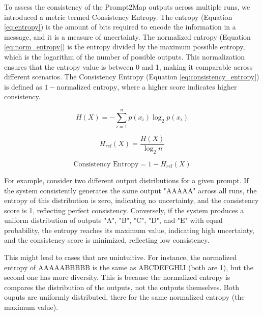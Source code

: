 To assess the consistency of the Prompt2Map outputs across multiple runs, we introduced a metric termed Consistency Entropy. The entropy (Equation \ref{eq:entropy}) is the amount of bits required to encode the information in a message, and it is a measure of uncertainty. The normalized entropy (Equation \ref{eq:norm_entropy}) is the entropy divided by the maximum possible entropy, which is the logarithm of the number of possible outputs. This normalization ensures that the entropy value is between 0 and 1, making it comparable across different scenarios. The Consistency Entropy (Equation \ref{eq:consistency_entropy}) is defined as \(1 - \text{normalized entropy}\), where a higher score indicates higher consistency.

\begin{equation}
    H(X) = - \sum_{i=1}^{n} p(x_i) \log_2 p(x_i)
    \label{eq:entropy}
\end{equation}

\begin{equation}
    H_{rel}(X) = \frac{H(X)}{\log_2 n} 
    \label{eq:norm_entropy}
\end{equation}

\begin{equation}
    \text{Consistency Entropy} = 1 - H_{rel}(X)
    \label{eq:consistency_entropy}
\end{equation}



For example, consider two different output distributions for a given prompt. If the system consistently generates the same output "AAAAA" across all runs, the entropy of this distribution is zero, indicating no uncertainty, and the consistency score is 1, reflecting perfect consistency. Conversely, if the system produces a uniform distribution of outputs "A", "B", "C", "D", and "E" with equal probability, the entropy reaches its maximum value, indicating high uncertainty, and the consistency score is minimized, reflecting low consistency.

This might lead to cases that are unintuitive. For instance, the normalized entropy of AAAAABBBBB is the same as ABCDEFGHIJ (both are 1), but the second one has more diversity. This is because the normalized entropy is compares the distribution of the outputs, not the outputs themselves. Both ouputs are uniformly distributed, there for the same normalized entropy (the maximum value).

